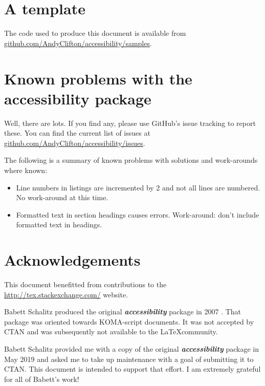 \documentclass[10pt,onecolumn]{article}
\newcommand{\packagename}[1]{\textbf{\emph{#1}}}
\begin{document}
\section{A template}
The code used to produce this document is available from \href{https://github.com/AndyClifton/accessibility/samples}{github.com/AndyClifton/accessibility/samples}.

\section{Known problems with the accessibility package}
Well, there are lots. If you find any, please use GitHub's issue tracking to report these. You can find the current list of issues at \href{https://github.com/AndyClifton/accessibility/issues}{github.com/AndyClifton/accessibility/issues}.

The following is a summary of known problems with solutions and work-arounds where known:
\begin{itemize}
\item Line numbers in listings are incremented by 2 and not all lines are numbered. No work-around at this time.
\item Formatted text in section headings causes errors. Work-around: don't include formatted text in headings.
\end{itemize}

\section*{Acknowledgements}
This document benefitted from contributions to the \href{http://tex.stackexchange.com/}{http://tex.stackexchange.com/} website.

Babett Schalitz produced the original \packagename{accessibility} package in 2007 \citep{schalitz2007}. That package was oriented towards KOMA-script documents. It was not accepted by CTAN and was subsequently not available to the \LaTeX community.

Babett Schalitz provided me with a copy of the original \packagename{accessibility} package in May 2019 and asked me to take up maintenance with a goal of submitting it to CTAN. This document is intended to support that effort. I am extremely grateful for all of Babett's work!

\cleardoublepage

\label{sec:Bib}

\end{document}
